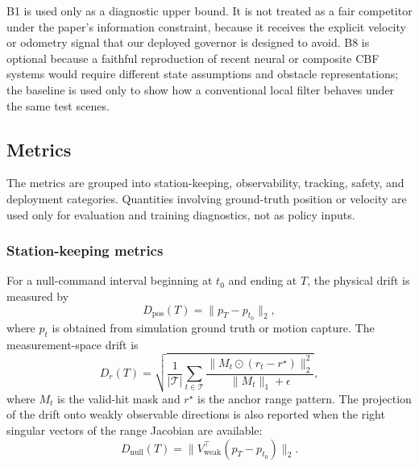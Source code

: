 \documentclass[11pt]{article}
\begin{document}
B1 is used only as a diagnostic upper bound.  It is not treated as a fair
competitor under the paper's information constraint, because it receives the
explicit velocity or odometry signal that our deployed governor is designed to
avoid.  B8 is optional because a faithful reproduction of recent neural or
composite CBF systems would require different state assumptions and obstacle
representations; the baseline is used only to show how a conventional local
filter behaves under the same test scenes.

\subsection{Metrics}
\label{sec:exp_metrics}

The metrics are grouped into station-keeping, observability, tracking, safety,
and deployment categories.  Quantities involving ground-truth position or
velocity are used only for evaluation and training diagnostics, not as policy
inputs.

\subsubsection{Station-keeping metrics}
For a null-command interval beginning at $t_0$ and ending at $T$, the physical
drift is measured by
\begin{equation}
    D_{\mathrm{pos}}(T) = \|p_T-p_{t_0}\|_2,
    \label{eq:metric_position_drift}
\end{equation}
where $p_t$ is obtained from simulation ground truth or motion capture.  The
measurement-space drift is
\begin{equation}
    D_{r}(T) =
    \sqrt{\frac{1}{|\mathcal{T}|}\sum_{t\in\mathcal{T}}
    \frac{\|M_t\odot(r_t-r^\star)\|_2^2}{\|M_t\|_1+\epsilon}},
    \label{eq:metric_range_drift}
\end{equation}
where $M_t$ is the valid-hit mask and $r^\star$ is the anchor range pattern.
The projection of the drift onto weakly observable directions is also reported
when the right singular vectors of the range Jacobian are available:
\begin{equation}
    D_{\mathrm{null}}(T) = \|V_{\mathrm{weak}}^\top(p_T-p_{t_0})\|_2.
    \label{eq:metric_null_drift}
\end{equation}
\end{document}

